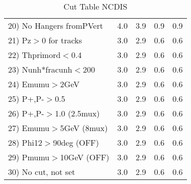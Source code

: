 \begin{table}[h!]
\begin{tabular}{||l||r|r|r|r||}
 20) No Hangers fromPVert &         4.0 &         3.9 &         0.9 &         0.9 \\
 21) Pz$>$0 for tracks    &         3.0 &         2.9 &         0.6 &         0.6 \\
 22) Thprimord$<$0.4      &         3.0 &         2.9 &         0.6 &         0.6 \\
 23) Nunh*fracunh$<$200   &         3.0 &         2.9 &         0.6 &         0.6 \\
 24) Emumu$>$2GeV         &         3.0 &         2.9 &         0.6 &         0.6 \\
 25) P+,P-$>$0.5          &         3.0 &         2.9 &         0.6 &         0.6 \\
 26) P+,P-$>$1.0 (2.5mux) &         3.0 &         2.9 &         0.6 &         0.6 \\
 27) Emumu$>$5GeV  (8mux) &         3.0 &         2.9 &         0.6 &         0.6 \\
 28) Phi12$>$90deg  (OFF) &         3.0 &         2.9 &         0.6 &         0.6 \\
 29) Pmumu$>$10GeV  (OFF) &         3.0 &         2.9 &         0.6 &         0.6 \\
 30) No cut, not set      &         3.0 &         2.9 &         0.6 &         0.6 \\
 \hline
 \hline
 \end{tabular}
 \caption{Cut Table  NCDIS  }
 \label{tab-cut_ncdis}
 \end{table}
